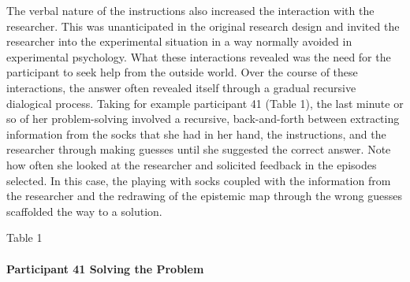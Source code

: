 \documentclass{article}
\begin{document}
The verbal nature of the instructions also increased the interaction with the researcher. This was unanticipated in the original research design and invited the researcher into the experimental situation in a way normally avoided in experimental psychology. What these interactions revealed was the need for the participant to seek help from the outside world. Over the course of these interactions, the answer often revealed itself through a gradual recursive dialogical process. Taking for example participant 41 (Table 1), the last minute or so of her problem-solving involved a recursive, back-and-forth between extracting information from the socks that she had in her hand, the instructions, and the researcher through making guesses until she suggested the correct answer. Note how often she looked at the researcher and solicited feedback in the episodes selected. In this case, the playing with socks coupled with the information from the researcher and the redrawing of the epistemic map through the wrong guesses scaffolded the way to a solution. 



Table 1

\paragraph{Participant 41 Solving the Problem }
\end{document}
